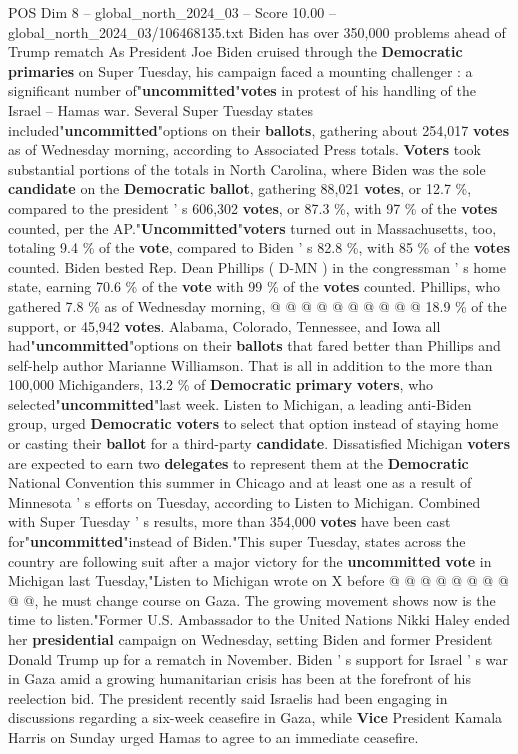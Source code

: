 \begin{textsample}{POS Dim 8 – global\_north\_2024\_03 – Score 10.00 – global\_north\_2024\_03/106468135.txt}  \label{ex:f8_pos_020}
Biden has over 350,000 problems ahead of Trump rematch As President Joe Biden cruised through the \textbf{Democratic} \textbf{primaries} on Super Tuesday, his campaign faced a mounting challenger : a significant number of"\textbf{uncommitted}"\textbf{votes} in protest of his handling of the Israel -- Hamas war.
Several Super Tuesday states included"\textbf{uncommitted}"options on their \textbf{ballots}, gathering about 254,017 \textbf{votes} as of Wednesday morning, according to Associated Press totals. \textbf{Voters} took substantial portions of the totals in North Carolina, where Biden was the sole \textbf{candidate} on the \textbf{Democratic} \textbf{ballot}, gathering 88,021 \textbf{votes}, or 12.7 \%, compared to the president ' s 606,302 \textbf{votes}, or 87.3 \%, with 97 \% of the \textbf{votes} counted, per the AP."\textbf{Uncommitted}"\textbf{voters} turned out in Massachusetts, too, totaling 9.4 \% of the \textbf{vote}, compared to Biden ' s 82.8 \%, with 85 \% of the \textbf{votes} counted.
Biden bested Rep.
Dean Phillips ( D-MN ) in the congressman ' s home state, earning 70.6 \% of the \textbf{vote} with 99 \% of the \textbf{votes} counted.
Phillips, who gathered 7.8 \% as of Wednesday morning, @ @ @ @ @ @ @ @ @ @ 18.9 \% of the support, or 45,942 \textbf{votes}.
Alabama, Colorado, Tennessee, and Iowa all had"\textbf{uncommitted}"options on their \textbf{ballots} that fared better than Phillips and self-help author Marianne Williamson.
That is all in addition to the more than 100,000 Michiganders, 13.2 \% of \textbf{Democratic} \textbf{primary} \textbf{voters}, who selected"\textbf{uncommitted}"last week.
Listen to Michigan, a leading anti-Biden group, urged \textbf{Democratic} \textbf{voters} to select that option instead of staying home or casting their \textbf{ballot} for a third-party \textbf{candidate}.
Dissatisfied Michigan \textbf{voters} are expected to earn two \textbf{delegates} to represent them at the \textbf{Democratic} National Convention this summer in Chicago and at least one as a result of Minnesota ' s efforts on Tuesday, according to Listen to Michigan.
Combined with Super Tuesday ' s results, more than 354,000 \textbf{votes} have been cast for"\textbf{uncommitted}"instead of Biden."This super Tuesday, states across the country are following suit after a major victory for the \textbf{uncommitted} \textbf{vote} in Michigan last Tuesday,"Listen to Michigan wrote on X before @ @ @ @ @ @ @ @ @ @, he must change course on Gaza.
The growing movement shows now is the time to listen."Former U.S.
Ambassador to the United Nations Nikki Haley ended her \textbf{presidential} campaign on Wednesday, setting Biden and former President Donald Trump up for a rematch in November.
Biden ' s support for Israel ' s war in Gaza amid a growing humanitarian crisis has been at the forefront of his reelection bid.
The president recently said Israelis had been engaging in discussions regarding a six-week ceasefire in Gaza, while \textbf{Vice} President Kamala Harris on Sunday urged Hamas to agree to an immediate ceasefire.

\end{textsample}
